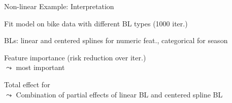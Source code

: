 \documentclass[10pt,compress,t,notes=noshow, xcolor=table]{beamer}
\begin{document}
\begin{framev}[align=top]{Non-linear Example: Interpretation}
\begin{itemizeM}
\item Fit model on bike data with different BL types (1000 iter.) %
\item BLs: linear and centered splines for numeric feat., categorical for season
\end{itemizeM}
\spacer[0.25]
\begin{itemizeM}
\item<2-> Feature importance (risk reduction over iter.)\\
$\leadsto$  most important
\item<2-> Total effect for \\
$\leadsto$ Combination of partial effects of linear BL and centered spline BL
\end{itemizeM}
\end{framev}




\end{document}
